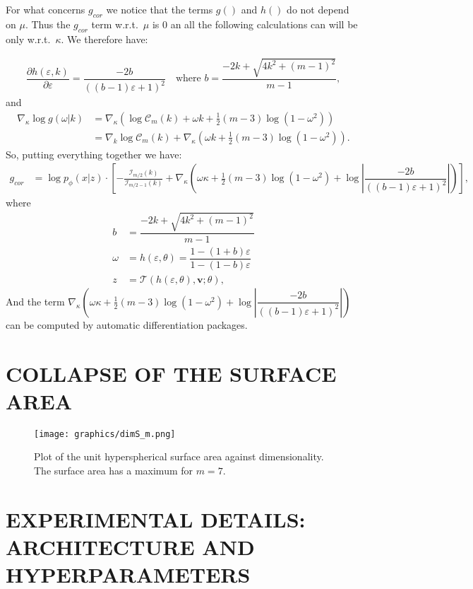 \documentclass[letterpaper]{article}
\newcommand{\vv}{\mathbf{v}}
\begin{document}
For what concerns $g_{cor}$ we notice that the terms $g()$ and $h()$ do not depend on $\mu$. Thus the $g_{cor}$ term w.r.t.~$\mu$ is $0$ an all the following calculations can will be only w.r.t.~$\kappa$. We therefore have:

\begin{align}
\dfrac{\partial h(\varepsilon, k)}{\partial\varepsilon}=\dfrac{-2b}{((b-1) \varepsilon + 1)^2}    \quad \text{where }b = \dfrac{-2k + \sqrt{4k^2 + (m-1)^2}}{m - 1},
\end{align}
and
\begin{align}
\nabla_\kappa \log g(\omega| k) &= \nabla_\kappa \left( \log \mathcal{C}_m(k) + \omega k + \frac{1}{2}(m-3) \log (1-\omega^2) \right) \\
&= \nabla_k  \log \mathcal{C}_m(k)  + \nabla_\kappa \left( \omega k + \frac{1}{2}(m-3) \log (1-\omega^2) \right).
\end{align}
So, putting everything together we have:
\begin{align}
    g_{cor} &= \log p_\phi(x | z) \cdot  \left[  - \frac{\mathcal{I}_{m/2}(k)}{\mathcal{I}_{m/2 - 1}(k)}  + \nabla_\kappa \left( \omega \kappa + \frac{1}{2}(m-3) \log (1-\omega^2) + \log |\dfrac{-2b}{((b-1) \varepsilon + 1)^2}| \right) \right],
\end{align}
where
\begin{align}
b &= \dfrac{-2k + \sqrt{4k^2 + (m-1)^2}}{m - 1}\\
\omega &= h(\varepsilon,\theta) = \dfrac{1 - (1 + b)\varepsilon}{1 - (1 - b)\varepsilon} \\
z &= \mathcal{T}(h(\varepsilon, \theta), \vv; \theta),
\end{align}
And the term $\nabla_\kappa \left( \omega \kappa + \frac{1}{2}(m-3) \log (1-\omega^2) + \log |\dfrac{-2b}{((b-1) \varepsilon + 1)^2}| \right)$ can be computed by automatic differentiation packages. 

\section{COLLAPSE OF THE SURFACE AREA}\label{app:surface}

\begin{figure}[H]
  \centering
  \texttt{[image: graphics/dimS\_m.png]}
  \caption{Plot of the unit hyperspherical surface area against dimensionality. The surface area has a maximum for $m=7$.}
  \label{fig:sphere-area}
\end{figure}

\section{EXPERIMENTAL DETAILS: ARCHITECTURE AND HYPERPARAMETERS}
\label{sect:appDetails}
\end{document}
